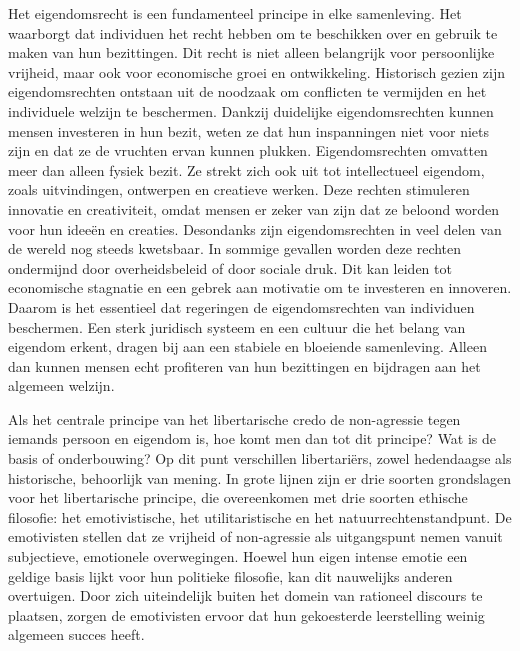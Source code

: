\documentclass[
  a5paper,
  smalldemyvopaper,10pt,twoside,onecolumn,openright,extrafontsizes,hidelinks]{memoir}
\begin{document}
Het eigendomsrecht is een fundamenteel principe in elke samenleving. Het
waarborgt dat individuen het recht hebben om te beschikken over en
gebruik te maken van hun bezittingen. Dit recht is niet alleen
belangrijk voor persoonlijke vrijheid, maar ook voor economische groei
en ontwikkeling. Historisch gezien zijn eigendomsrechten ontstaan uit de
noodzaak om conflicten te vermijden en het individuele welzijn te
beschermen. Dankzij duidelijke eigendomsrechten kunnen mensen investeren
in hun bezit, weten ze dat hun inspanningen niet voor niets zijn en dat
ze de vruchten ervan kunnen plukken. Eigendomsrechten omvatten meer dan
alleen fysiek bezit. Ze strekt zich ook uit tot intellectueel eigendom,
zoals uitvindingen, ontwerpen en creatieve werken. Deze rechten
stimuleren innovatie en creativiteit, omdat mensen er zeker van zijn dat
ze beloond worden voor hun ideeën en creaties. Desondanks zijn
eigendomsrechten in veel delen van de wereld nog steeds kwetsbaar. In
sommige gevallen worden deze rechten ondermijnd door overheidsbeleid of
door sociale druk. Dit kan leiden tot economische stagnatie en een
gebrek aan motivatie om te investeren en innoveren. Daarom is het
essentieel dat regeringen de eigendomsrechten van individuen beschermen.
Een sterk juridisch systeem en een cultuur die het belang van eigendom
erkent, dragen bij aan een stabiele en bloeiende samenleving. Alleen dan
kunnen mensen echt profiteren van hun bezittingen en bijdragen aan het
algemeen welzijn.

Als het centrale principe van het libertarische credo de non-agressie
tegen iemands persoon en eigendom is, hoe komt men dan tot dit principe?
Wat is de basis of onderbouwing? Op dit punt verschillen libertariërs,
zowel hedendaagse als historische, behoorlijk van mening. In grote
lijnen zijn er drie soorten grondslagen voor het libertarische principe,
die overeenkomen met drie soorten ethische filosofie: het
emotivistische, het utilitaristische en het natuurrechtenstandpunt. De
emotivisten stellen dat ze vrijheid of non-agressie als uitgangspunt
nemen vanuit subjectieve, emotionele overwegingen. Hoewel hun eigen
intense emotie een geldige basis lijkt voor hun politieke filosofie, kan
dit nauwelijks anderen overtuigen. Door zich uiteindelijk buiten het
domein van rationeel discours te plaatsen, zorgen de emotivisten ervoor
dat hun gekoesterde leerstelling weinig algemeen succes heeft.
\end{document}
